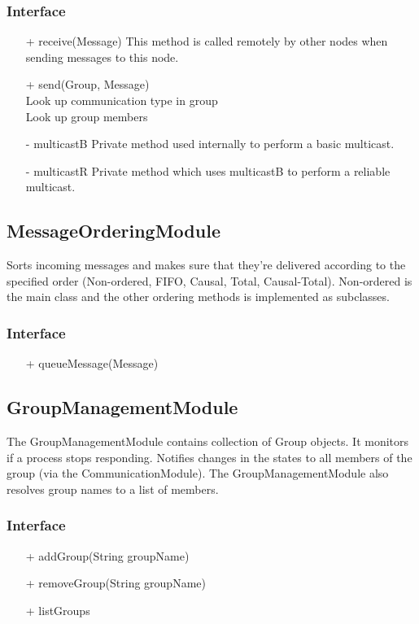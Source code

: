 \documentclass[english]{article}
\begin{document}
\subsubsection{Interface}
\begin{itemize}
\item[+] receive(Message)
	This method is called remotely by other nodes when sending messages to this node.

\item[+] send(Group, Message) \\
	Look up communication type in group \\
	Look up group members

\item[-] multicastB
	Private method used internally to perform a basic multicast.

\item[-] multicastR
	Private method which uses multicastB to perform a reliable multicast.

\end{itemize}

\subsection{MessageOrderingModule}
Sorts incoming messages and makes sure that they're delivered according to the specified order (Non-ordered, FIFO, Causal, Total, Causal-Total). Non-ordered is the main class and the other ordering methods is implemented as subclasses. 

\subsubsection{Interface}
\begin{itemize}
\item[+] queueMessage(Message)
\end{itemize}

\subsection{GroupManagementModule}
The GroupManagementModule contains collection of Group objects. It monitors if a process stops responding. Notifies changes in the states to all members of the group (via the CommunicationModule). The GroupManagementModule also resolves group names to a list of members.

\subsubsection{Interface}
\begin{itemize}
\item[+] addGroup(String groupName)
\item[+] removeGroup(String groupName)
\item[+] listGroups
\end{itemize}
\end{document}
